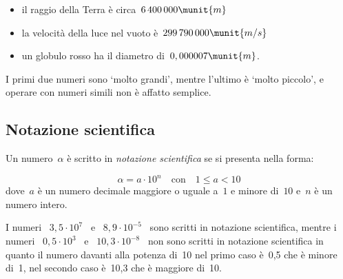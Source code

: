 \begin{itemize} [nosep]
\item il raggio della Terra è circa~\(6\,400\,000\munit{m}\)
\item la velocità della luce nel vuoto è~\(299\,790\,000\munit{m/s}\)
\item un globulo rosso ha il diametro di~\(0,000007\munit{m}\).
\end{itemize}

I primi due numeri sono `molto grandi', mentre l'ultimo è `molto piccolo', e 
operare con numeri simili non è affatto semplice.

\subsection{Notazione scientifica}
\begin{definizione}{}{}
Un numero~\(\alpha\) è scritto in \emph{notazione scientifica} se
si presenta nella forma:

\vspace{-1em}
\[\alpha = a\cdot 10^n \quad \text{con} \quad 1 \leqslant a < 10\] 
dove~\(a\) è un numero decimale maggiore o uguale a~\(1\) e minore di~\(10\) 
e~\(n\) è un numero intero.
\end{definizione}

% 

\begin{esempio}{}{}
I numeri~ \(3,5\cdot10^7\)~ e ~\(8,9\cdot10^{-5}\)~ sono scritti in 
notazione scientifica, mentre i numeri~ \(0,5\cdot10^3\)~ 
e ~\(10,3\cdot 10^{-8}\)~ non sono scritti in notazione scientifica in 
quanto il numero davanti alla potenza di~10 nel primo caso è~0,5 che è 
minore di~1, nel secondo caso è~10,3 che è maggiore di~10.
\end{esempio}

